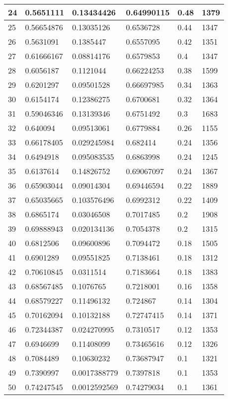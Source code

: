\begin{longtable}{|l|l|l|l|l|l|}
24 & 0.5651111 & 0.13434426 & 0.64990115 & 0.48 & 1379 \\ \hline 
25 & 0.56654876 & 0.13035126 & 0.6536728 & 0.44 & 1347 \\ \hline 
26 & 0.5631091 & 0.1385447 & 0.6557095 & 0.42 & 1351 \\ \hline 
27 & 0.61666167 & 0.08814176 & 0.6579853 & 0.4 & 1347 \\ \hline 
28 & 0.6056187 & 0.1121044 & 0.66224253 & 0.38 & 1599 \\ \hline 
29 & 0.6201297 & 0.09501528 & 0.66697985 & 0.34 & 1363 \\ \hline 
30 & 0.6154174 & 0.12386275 & 0.6700681 & 0.32 & 1364 \\ \hline 
31 & 0.59046346 & 0.13139346 & 0.6751492 & 0.3 & 1683 \\ \hline 
32 & 0.640094 & 0.09513061 & 0.6779884 & 0.26 & 1155 \\ \hline 
33 & 0.66178405 & 0.029245984 & 0.682414 & 0.24 & 1356 \\ \hline 
34 & 0.6494918 & 0.095083535 & 0.6863998 & 0.24 & 1245 \\ \hline 
35 & 0.6137614 & 0.14826752 & 0.69067097 & 0.24 & 1367 \\ \hline 
36 & 0.65903044 & 0.09014304 & 0.69446594 & 0.22 & 1889 \\ \hline 
37 & 0.65035665 & 0.103576496 & 0.6992312 & 0.22 & 1409 \\ \hline 
38 & 0.6865174 & 0.03046508 & 0.7017485 & 0.2 & 1908 \\ \hline 
39 & 0.69888943 & 0.020134136 & 0.7054378 & 0.2 & 1315 \\ \hline 
40 & 0.6812506 & 0.09600896 & 0.7094472 & 0.18 & 1505 \\ \hline 
41 & 0.6901289 & 0.09551825 & 0.7138461 & 0.18 & 1312 \\ \hline 
42 & 0.70610845 & 0.0311514 & 0.7183664 & 0.18 & 1383 \\ \hline 
43 & 0.68567485 & 0.1076765 & 0.7218001 & 0.16 & 1358 \\ \hline 
44 & 0.68579227 & 0.11496132 & 0.724867 & 0.14 & 1304 \\ \hline 
45 & 0.70162094 & 0.10132188 & 0.72747415 & 0.14 & 1371 \\ \hline 
46 & 0.72344387 & 0.024270995 & 0.7310517 & 0.12 & 1353 \\ \hline 
47 & 0.6946699 & 0.11408099 & 0.73465616 & 0.12 & 1326 \\ \hline 
48 & 0.7084489 & 0.10630232 & 0.73687947 & 0.1 & 1321 \\ \hline 
49 & 0.7390997 & 0.0017388779 & 0.7397818 & 0.1 & 1353 \\ \hline 
50 & 0.74247545 & 0.0012592569 & 0.74279034 & 0.1 & 1361 \\ \hline 
\end{longtable}